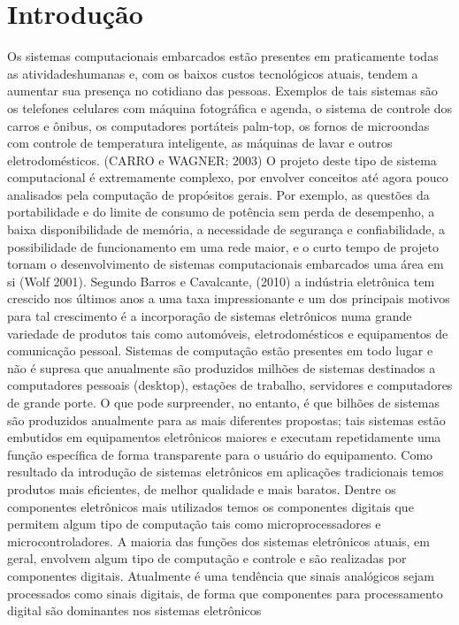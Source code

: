 \chapter{Introdução}
\label{}
	Os sistemas computacionais embarcados estão presentes em praticamente todas as atividadeshumanas e, com os baixos custos tecnológicos atuais, tendem a aumentar sua presença no cotidiano das pessoas. Exemplos de tais sistemas são os telefones celulares com máquina fotográfica e agenda, o sistema de controle dos carros e ônibus, os computadores portáteis palm-top, os fornos de microondas com controle de temperatura inteligente, as máquinas de lavar e outros eletrodomésticos. (CARRO e WAGNER; 2003)
O projeto deste tipo de sistema computacional é extremamente complexo, por envolver conceitos até agora pouco analisados pela computação de propósitos gerais. Por exemplo, as questões da portabilidade e do limite de consumo de potência sem perda de desempenho, a baixa disponibilidade de memória, a necessidade de segurança e confiabilidade, a possibilidade de funcionamento em uma rede maior, e o curto tempo de projeto tornam o desenvolvimento de sistemas computacionais embarcados uma área em si (Wolf 2001).
Segundo Barros e Cavalcante, (2010) a indústria eletrônica tem crescido nos últimos anos a uma taxa impressionante e um dos principais motivos para tal crescimento é a incorporação de sistemas eletrônicos numa grande variedade de produtos tais como automóveis, eletrodomésticos e equipamentos de comunicação pessoal. Sistemas de computação estão presentes em todo lugar e não é supresa que anualmente são produzidos milhões de sistemas destinados a computadores pessoais (desktop), estações de trabalho, servidores e computadores de grande porte. O que pode surpreender, no entanto, é que bilhões de sistemas são produzidos anualmente para as mais diferentes propostas; tais sistemas estão embutidos em equipamentos eletrônicos maiores e executam repetidamente uma função específica de forma transparente para o usuário do equipamento. Como resultado da introdução de sistemas eletrônicos em aplicações tradicionais temos produtos mais eficientes, de melhor qualidade e mais baratos. Dentre os componentes eletrônicos mais utilizados temos os componentes digitais que permitem algum tipo de computação tais como microprocessadores e microcontroladores. 
A maioria das funções dos sistemas eletrônicos atuais, em geral, envolvem algum tipo de computação e controle e são realizadas por componentes digitais. Atualmente é uma tendência que sinais analógicos sejam processados como sinais digitais, de forma que componentes para processamento digital são dominantes nos sistemas eletrônicos 




